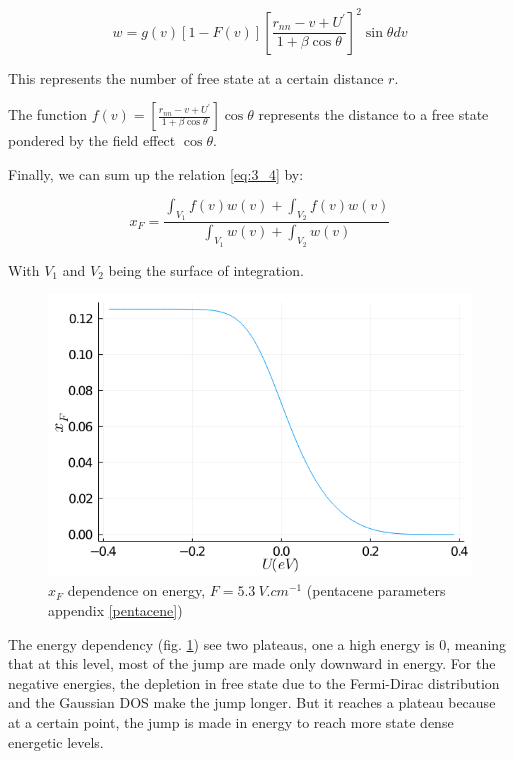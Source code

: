 \begin{equation}
    w = g(v)\left[1-F(v)\right]\left[\frac{r_{nn}-v+U^{\prime}}{1+\beta \cos \theta}\right]^{2} \sin \theta d v
\end{equation}

This represents the number of free state at a certain distance $r$.

The function $f(v) = \left[\frac{r_{nn}-v+U^{\prime}}{1+\beta \cos \theta}\right] \cos \theta$ represents the distance to a free state pondered by the field effect $\cos \theta$.

Finally, we can sum up the relation \ref{eq:3_4} by:

\begin{equation}
    x_F = \frac{\int_{V_1} f(v)w(v) + \int_{V_2} f(v)w(v)}{\int_{V_1} w(v) + \int_{V_2} w(v)}
\end{equation}

With $V_1$ and $V_2$ being the surface of integration.

\begin{figure}[!h]
    \centering
    \includegraphics*[width=.5\paperwidth]{figures/3_elec/xf.png}
    \caption{$x_F$ dependence on energy, $F = \SI{5.3}{V . cm^{-1}}$ (pentacene parameters appendix \ref{pentacene})\label{fig:3_4}}
\end{figure}

The energy dependency (fig. \ref{fig:3_4}) see two plateaus, one a high energy is $0$, meaning that at this level, most of the jump are made only downward in energy. For the negative energies, the depletion in free state due to the Fermi-Dirac distribution and the Gaussian DOS make the jump longer. But it reaches a plateau because at a certain point, the jump is made in energy to reach more state dense energetic levels.

